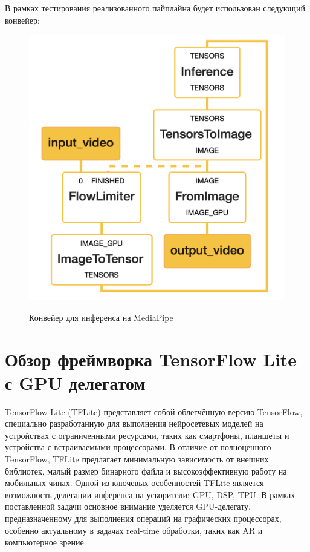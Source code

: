 \documentclass[a4paper,14pt]{extreport}
\begin{document}
            В рамках тестирования реализованного пайплайна будет использован следующий конвейер:
            \begin{figure}[!h]
                \begin{center}
                    \begin{minipage}[!h]{0.43\linewidth}
                        \includegraphics[width=\linewidth]{images-mediapipe/pipline.png}
                        \label{ris:mediapipe}
                        \caption{Конвейер для инференса на MediaPipe}
                    \end{minipage}
                \end{center}
            \end{figure}

        \section{Обзор фреймворка TensorFlow Lite с GPU делегатом}
        TensorFlow Lite (TFLite) представляет собой облегчённую версию TensorFlow, специально разработанную для выполнения нейросетевых моделей на устройствах с ограниченными ресурсами, таких как смартфоны, планшеты и устройства с встраиваемыми процессорами. В отличие от полноценного TensorFlow, TFLite предлагает минимальную зависимость от внешних библиотек, малый размер бинарного файла и высокоэффективную работу на мобильных чипах. Одной из ключевых особенностей TFLite является возможность делегации инференса на ускорители: GPU, DSP, TPU. В рамках поставленной задачи основное внимание уделяется GPU-делегату, предназначенному для выполнения операций на графических процессорах, особенно актуальному в задачах real-time обработки, таких как AR и компьютерное зрение.
        
\end{document}
